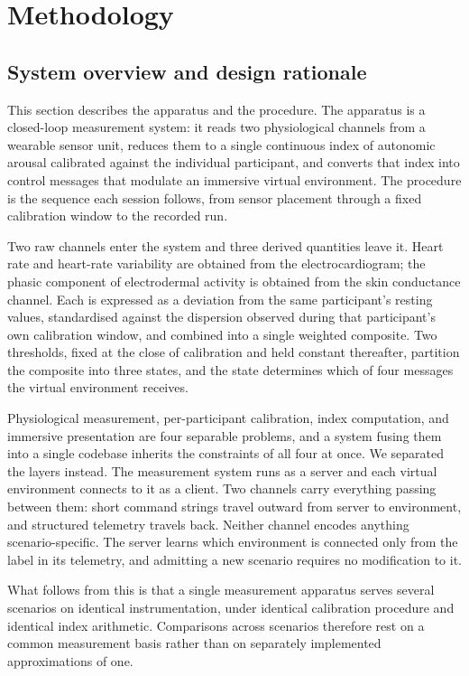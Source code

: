 
\section{Methodology}
\label{sec:methodology}

\subsection{System overview and design rationale}
\label{sec:overview}

This section describes the apparatus and the procedure. The
apparatus is a closed-loop measurement system: it reads two
physiological channels from a wearable sensor unit, reduces them
to a single continuous index of autonomic arousal calibrated
against the individual participant, and converts that index into
control messages that modulate an immersive virtual environment.
The procedure is the sequence each session follows, from sensor
placement through a fixed calibration window to the recorded run.

Two raw channels enter the system and three derived quantities
leave it. Heart rate and heart-rate variability are obtained from
the electrocardiogram; the phasic component of electrodermal
activity is obtained from the skin conductance channel. Each is
expressed as a deviation from the same participant's resting
values, standardised against the dispersion observed during that
participant's own calibration window, and combined into a single
weighted composite. Two thresholds, fixed at the close of
calibration and held constant thereafter, partition the composite
into three states, and the state determines which of four messages
the virtual environment receives.

Physiological measurement, per-participant calibration, index
computation, and immersive presentation are four separable
problems, and a system fusing them into a single codebase
inherits the constraints of all four at once. We separated the
layers instead. The measurement system runs as a server and each
virtual environment connects to it as a client. Two channels
carry everything passing between them: short command strings
travel outward from server to environment, and structured
telemetry travels back. Neither channel encodes anything
scenario-specific. The server learns which environment is
connected only from the label in its telemetry, and admitting a
new scenario requires no modification to it.

What follows from this is that a single measurement apparatus
serves several scenarios on identical instrumentation, under
identical calibration procedure and identical index arithmetic.
Comparisons across scenarios therefore rest on a common
measurement basis rather than on separately implemented
approximations of one.

